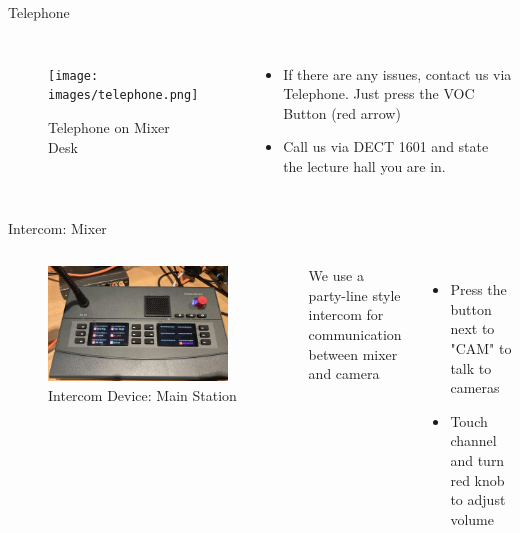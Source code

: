 
\begin{frame}{Telephone}
	\begin{columns}[T,onlytextwidth]
		\begin{figure}
			\centering
			\texttt{[image: images/telephone.png]}
			\caption{Telephone on Mixer Desk}
		\end{figure}
		\begin{itemize}
		\item If there are any issues, contact us via Telephone. Just press the VOC Button (red arrow)
		\item Call us via DECT 1601 and state the lecture hall you are in.
		\end{itemize}

	\end{columns}
\end{frame}

\begin{frame}{Intercom: Mixer}
	\begin{columns}[T,onlytextwidth]
		\begin{figure}
			\centering
			\includegraphics[width=0.9\textwidth]{images/riedel-intercom-panel.jpg}
			\caption{Intercom Device: Main Station}
		\end{figure}
			We use a party-line style intercom for communication between mixer and camera
		\begin{itemize}
			\item Press the button next to "CAM" to talk to cameras
			\item Touch channel and turn red knob to adjust volume
		\end{itemize}
	\end{columns}
\end{frame}

